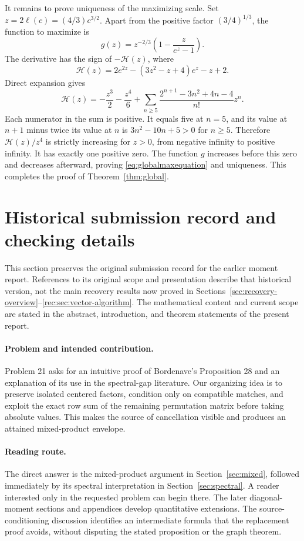 \documentclass[11pt]{article}
\theoremstyle{definition}
\theoremstyle{remark}
\newcommand{\1}{\mathbf 1}
\begin{document}
It remains to prove uniqueness of the maximizing scale. Set $z=2\ell(c)=(4/3)c^{3/2}$. Apart from the positive factor $(3/4)^{1/3}$, the function to maximize is
\[
g(z)=z^{-2/3}\left(1-\frac z{e^z-1}\right).
\]
The derivative has the sign of $-\mathcal H(z)$, where
\[
\mathcal H(z)=2e^{2z}-(3z^2-z+4)e^z-z+2.
\]
Direct expansion gives
\[
\mathcal H(z)=-\frac{z^3}2-\frac{z^4}6
+\sum_{n\ge5}\frac{2^{n+1}-3n^2+4n-4}{n!}z^n.
\]
Each numerator in the sum is positive. It equals five at $n=5$, and its value at $n+1$ minus twice its value at $n$ is $3n^2-10n+5>0$ for $n\ge5$. Therefore $\mathcal H(z)/z^4$ is strictly increasing for $z>0$, from negative infinity to positive infinity. It has exactly one positive zero. The function $g$ increases before this zero and decreases afterward, proving \eqref{eq:globalmaxequation} and uniqueness. This completes the proof of Theorem~\ref{thm:global}.


\clearpage
\section{Historical submission record and checking details}\label{sec:historical-record}
This section preserves the original submission record for the earlier
moment report. References to its original scope and presentation describe
that historical version, not the main recovery results now proved in
Sections~\ref{sec:recovery-overview}--\ref{rec:sec:vector-algorithm}.
The mathematical content and current scope are stated in the abstract,
introduction, and theorem statements of the present report.



\paragraph{Problem and intended contribution.}
Problem 21 asks for an intuitive proof of Bordenave's Proposition 28 and an explanation of its use in the spectral-gap literature. Our organizing idea is to preserve isolated centered factors, condition only on compatible matches, and exploit the exact row sum of the remaining permutation matrix before taking absolute values. This makes the source of cancellation visible and produces an attained mixed-product envelope.

\paragraph{Reading route.}
The direct answer is the mixed-product argument in Section~\ref{sec:mixed}, followed immediately by its spectral interpretation in Section~\ref{sec:spectral}. A reader interested only in the requested problem can begin there. The later diagonal-moment sections and appendices develop quantitative extensions. The source-conditioning discussion identifies an intermediate formula that the replacement proof avoids, without disputing the stated proposition or the graph theorem.
\end{document}
